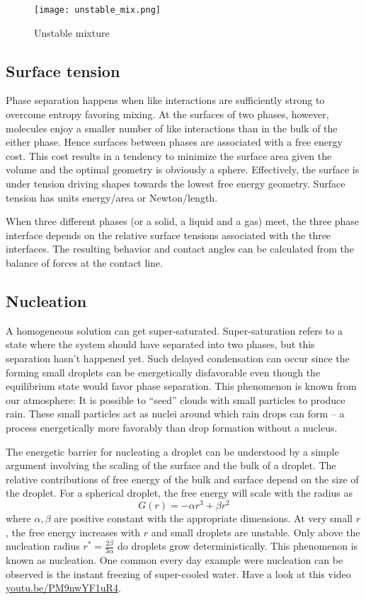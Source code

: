 \begin{figure}[tb]
	\centering
	\texttt{[image: unstable\_mix.png]}
	\caption{Unstable mixture}
	\label{fig:unstable_mix}
\end{figure}

\subsection*{Surface tension}
Phase separation happens when like interactions are sufficiently strong to overcome entropy favoring mixing.
At the surfaces of two phases, however, molecules enjoy a smaller number of like interactions than in the bulk of the either phase.
Hence surfaces between phases are associated with a free energy cost.
This cost results in a tendency to minimize the surface area given the volume and the optimal geometry is obviously a sphere.
Effectively, the surface is under tension driving shapes towards the lowest free energy geometry.
Surface tension has units energy/area or Newton/length.

When three different phases (or a solid, a liquid and a gas) meet, the three phase interface depends on the relative surface tensions associated with the three interfaces.
The resulting behavior and contact angles can be calculated from the balance of forces at the contact line.

\subsection*{Nucleation}
A homogeneous solution can get super-saturated.
Super-saturation refers to a state where the system should have separated into two phases, but this separation hasn't happened yet.
Such delayed condensation can occur since the forming small droplets can be energetically disfavorable even though the equilibrium state would favor phase separation.
This phenomenon is known from our atmosphere: It is possible to ``seed'' clouds with small particles to produce rain.
These small particles act as nuclei around which rain drops can form -- a process energetically more favorably than drop formation without a nucleus.

The energetic barrier for nucleating a droplet can be understood by a simple argument involving the scaling of the surface and the bulk of a droplet.
The relative contributions of free energy of the bulk and surface depend on the size of the droplet.
For a spherical droplet, the free energy will scale with the radius as
\begin{equation}
G(r) = -\alpha r^3 + \beta r^2
\end{equation}
where $\alpha,\beta$ are positive constant with the appropriate dimensions.
At very small $r$, the free energy increases with $r$ and small droplets are unstable.
Only above the nucleation radius $r^* = \frac{2\beta}{3\alpha}$ do droplets grow deterministically.
This phenomenon is known as nucleation.
One common every day example were nucleation can be observed is the instant freezing of super-cooled water.
Have a look at this video \href{https://youtu.be/PM9nwYF1uR4}{youtu.be/PM9nwYF1uR4}.


